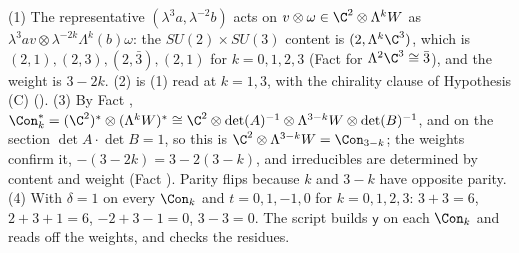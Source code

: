 (1) The representative $(\lambda^{3}a, \lambda^{-2}b)$ acts on $v \otimes \omega \in \C^{2} \otimes \Lambda^{k}W$ as $\lambda^{3}av \otimes \lambda^{-2k}\Lambda^{k}(b)\omega$: the $SU(2) \times SU(3)$ content is $(2, \Lambda^{k}\C^{3})$, which is $(2,1), (2,3), (2,\bar{3}), (2,1)$ for $k = 0, 1, 2, 3$ (Fact  for $\Lambda^{2}\C^{3} \cong \bar{3}$), and the weight is $3 - 2k$. (2) is (1) read at $k = 1, 3$, with the chirality clause of Hypothesis (C) (). (3) By Fact , $\Con_{k}^{*} = (\C^{2})^{*} \otimes (\Lambda^{k}W)^{*} \cong \C^{2} \otimes \det(A)^{-1} \otimes \Lambda^{3-k}W \otimes \det(B)^{-1}$, and on the section $\det A \cdot \det B = 1$, so this is $\C^{2} \otimes \Lambda^{3-k}W = \Con_{3-k}$; the weights confirm it, $-(3 - 2k) = 3 - 2(3-k)$, and irreducibles are determined by content and weight (Fact ). Parity flips because $k$ and $3 - k$ have opposite parity. (4) With $\delta = 1$ on every $\Con_{k}$ and $t = 0, 1, -1, 0$ for $k = 0, 1, 2, 3$: $3 + 3 = 6$, $2 + 3 + 1 = 6$, $-2 + 3 - 1 = 0$, $3 - 3 = 0$. The script builds $\mathsf{y}$ on each $\Con_{k}$ and reads off the weights, and checks the residues.

